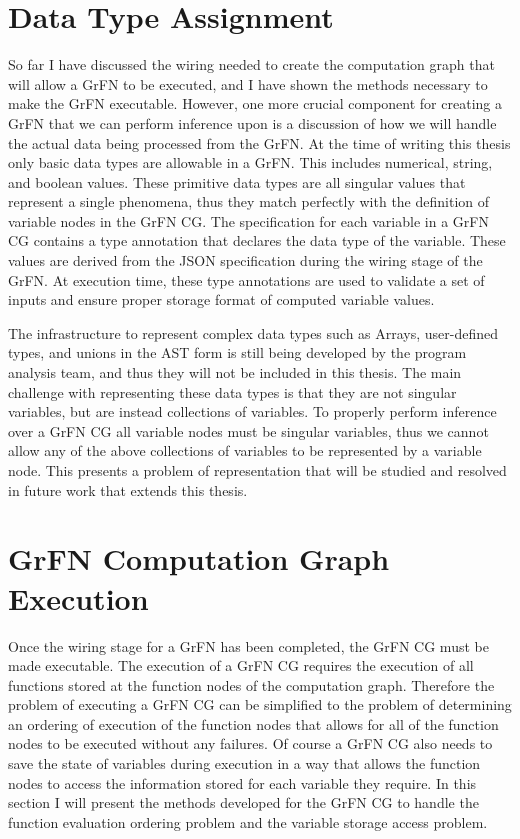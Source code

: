\section{Data Type Assignment\label{sec:data_types}}
So far I have discussed the wiring needed to create the computation graph that will allow a GrFN to be executed, and I have shown the methods necessary to make the GrFN executable. However, one more crucial component for creating a GrFN that we can perform inference upon is a discussion of how we will handle the actual data being processed from the GrFN. At the time of writing this thesis only basic data types are allowable in a GrFN. This includes numerical, string, and boolean values. These primitive data types are all singular values that represent a single phenomena, thus they match perfectly with the definition of variable nodes in the GrFN CG. The specification for each variable in a GrFN CG contains a type annotation that declares the data type of the variable. These values are derived from the JSON specification during the wiring stage of the GrFN. At execution time, these type annotations are used to validate a set of inputs and ensure proper storage format of computed variable values.

The infrastructure to represent complex data types such as Arrays, user-defined types, and unions in the AST form is still being developed by the program analysis team, and thus they will not be included in this thesis. The main challenge with representing these data types is that they are not singular variables, but are instead collections of variables. To properly perform inference over a GrFN CG all variable nodes must be singular variables, thus we cannot allow any of the above collections of variables to be represented by a variable node. This presents a problem of representation that will be studied  and resolved in future work that extends this thesis.


\section{GrFN Computation Graph Execution\label{sec:cg_execution}}
Once the wiring stage for a GrFN has been completed, the GrFN CG must be made executable. The execution of a GrFN CG requires the execution of all functions stored at the function nodes of the computation graph. Therefore the problem of executing a GrFN CG can be simplified to the problem of determining an ordering of execution of the function nodes that allows for all of the function nodes to be executed without any failures. Of course a GrFN CG also needs to save the state of variables during execution in a way that allows the function nodes to access the information stored for each variable they require. In this section I will present the methods developed for the GrFN CG to handle the function evaluation ordering problem and the variable storage access problem.

